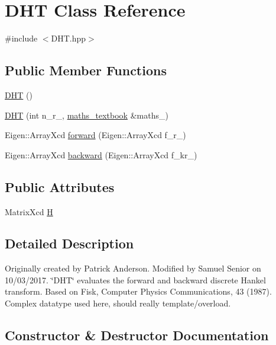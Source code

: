 \hypertarget{class_d_h_t}{}\section{D\+HT Class Reference}
\label{class_d_h_t}


{\ttfamily \#include $<$D\+H\+T.\+hpp$>$}

\subsection*{Public Member Functions}
\begin{DoxyCompactItemize}
\item 
\hyperlink{class_d_h_t_addc81efbe31ac923b054636f675a2d8b}{D\+HT} ()
\item 
\hyperlink{class_d_h_t_a9f6e442f2bc6f1e2f5d2dd2a3f9a557d}{D\+HT} (int n\+\_\+r\+\_\+, \hyperlink{classmaths__textbook}{maths\+\_\+textbook} \&maths\+\_\+)
\item 
Eigen\+::\+Array\+Xcd \hyperlink{class_d_h_t_a916089f65c6ad05eace5e1f9854f50f4}{forward} (Eigen\+::\+Array\+Xcd f\+\_\+r\+\_\+)
\item 
Eigen\+::\+Array\+Xcd \hyperlink{class_d_h_t_a923f3d375e55f2dbdab2763de372f440}{backward} (Eigen\+::\+Array\+Xcd f\+\_\+kr\+\_\+)
\end{DoxyCompactItemize}
\subsection*{Public Attributes}
\begin{DoxyCompactItemize}
\item 
Matrix\+Xcd \hyperlink{class_d_h_t_ac17a580b606f25c937dbdc81dba517d7}{H}
\end{DoxyCompactItemize}


\subsection{Detailed Description}
Originally created by Patrick Anderson. Modified by Samuel Senior on 10/03/2017. \char`\"{}\+D\+H\+T\char`\"{} evaluates the forward and backward discrete Hankel transform. Based on Fisk, Computer Physics Communications, 43 (1987). Complex datatype used here, should really template/overload. 

\subsection{Constructor \& Destructor Documentation}
\mbox{\label{class_d_h_t_addc81efbe31ac923b054636f675a2d8b}} 
